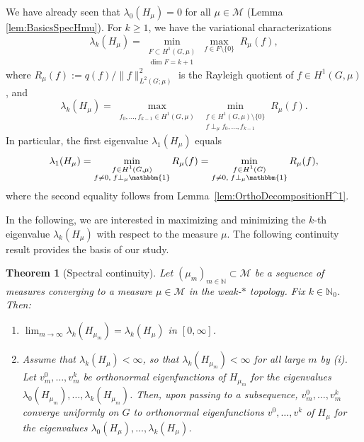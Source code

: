 \documentclass[reqno]{amsart}
\theoremstyle{plain}
\newtheorem{thm}{Theorem}[section]
\theoremstyle{definition}
\theoremstyle{remark}
\numberwithin{equation}{section}
\newcommand{\N}{\mathbb{N}}     %
\newcommand{\cM}{\mathcal{M}}
\newcommand{\one}{\mathbbm{1}}
\begin{document}
We have already seen that $\lambda_0(H_\mu) = 0$ for all $\mu  \in \cM$ (Lemma \ref{lem:BasicsSpecHmu}). For $k \ge 1$, we have the variational characterizations
\[
\lambda_k(H_\mu) = \min\limits_{\substack{F \subset H^1(G,\mu) \\ \dim F = k+1}} \max\limits_{f \in F\setminus\{0\} } \;R_\mu(f),
\]
where $R_\mu(f) := {q(f)}/{\|f\|^2_{L^2(G;\mu)}}$ is the Rayleigh quotient of $f \in H^1(G, \mu)$, and
\[
\lambda_k(H_\mu) =\max\limits_{\substack{f_0, \dots, f_{k-1} \in H^1(G,\mu)}} \min\limits_{\substack{f \in H^1(G, \mu)\setminus\{0\} \\ f \perp_\mu f_0, \dots, f_{k-1}}} R_\mu (f).
\]
In particular, the first eigenvalue $\lambda_1(H_\mu)$ equals
\begin{equation} \label{eq:MinLambda1}
	\lambda_1(H_\mu) =\min_{\substack{f \in H^1(G,\mu) \\ f \neq  0,\; f \perp_{\mu} \one}} R_\mu (f) =  \min_{\substack{f \in H^1(G)\\ f \neq  0,\; f \perp_\mu \one}}R_\mu (f),
\end{equation}
where the second equality follows from Lemma~\ref{lem:OrthoDecompositionH^1}.



In the following, we are interested in maximizing and minimizing the $k$-th eigenvalue $\lambda_k(H_\mu)$ with respect to the measure $\mu$. The following continuity result provides the basis of our study.

\begin{thm}[Spectral continuity]\label{thm: spec conv }
	Let $(\mu_m)_{m \in\N} \subset \cM$ be a sequence of measures converging to a measure $\mu \in \cM$ in the weak-$\ast$ topology. Fix $k \in \N_{0}$. Then:
	\begin{enumerate}[label={(\roman*)},ref={(\roman*)}]
		\item \label{thm:SpectralConvergence1} $\lim_{m \to  \infty} \lambda_k(H_{\mu_m}) =  \lambda_k(H_\mu)$ in $[0, \infty]$.
		\item Assume that $\lambda_k(H_\mu) < \infty$, so that $\lambda_k(H_{\mu_m}) < \infty$ for all large $m$ by (i). Let $v^0_m, \dots, v^k_m$ be orthonormal eigenfunctions of $H_{\mu_m}$ for the eigenvalues $\lambda_0(H_{\mu_m}), \dots, \lambda_k(H_{\mu_m})$. Then, upon passing to a subsequence, $v^0_m, \dots, v^k_m$ converge uniformly on $G$ to orthonormal eigenfunctions $v^0, \dots, v^k$ of $H_\mu$ for the eigenvalues $\lambda_0(H_{\mu}), \dots, \lambda_k(H_{\mu})$.
	\end{enumerate}
	
\end{thm}
\end{document}
